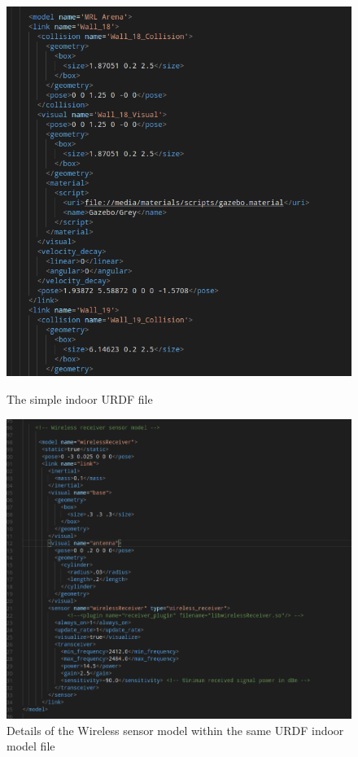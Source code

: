 \documentclass[11pt,a4paper]{article}
\begin{document}
\begin{figure}[!htb]
    \centering
    \begin{minipage}{.5\textwidth}
        \centering
        \includegraphics[width=0.7\linewidth, height=0.2\textheight]{figures/world_walls}
        \caption{The simple indoor URDF file}
        \label{fig:small_indoor}
    \end{minipage}%
    \begin{minipage}{0.5\textwidth}
        \centering
        \includegraphics[width=1\linewidth, height=0.2\textheight]{figures/WirelessTransmitter}
        \caption{Details of the Wireless sensor model within the same URDF indoor model file}
        \label{fig:wireless_trans}
    \end{minipage}
 \end{figure}
\end{document}
